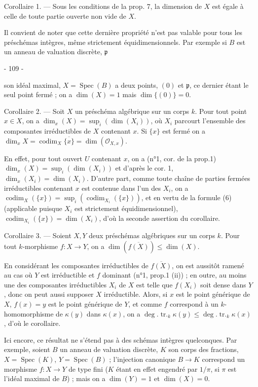 Corollaire 1. — Sous les conditions de la prop. 7, la dimension de $X$ est égale à celle de toute partie ouverte non vide de $X$.

Il convient de noter que cette dernière propriété n'est pas valable pour tous les préschémas intègres, même strictement équidimensionnels. Par exemple si $B$ est un anneau de valuation discrète, $\mathfrak{p}$

\newpage


- 109 -

son idéal maximal, $X=\operatorname{Spec}(B)$ a deux points, $(0)$ et $\mathfrak{p}$, ce dernier étant le seul point fermé ; on a $\dim(X)=1$ mais $\dim\{(0)\}=0$.

Corollaire 2. — Soit $X$ un préschéma algébrique sur un corps $k$. Pour tout point $x \in X$, on a $\dim_x(X)=\sup_i(\dim(X_i))$, où $X_i$ parcourt l'ensemble des composantes irréductibles de $X$ contenant $x$. Si $\{x\}$ est fermé on a $\dim_x X = \operatorname{codim}_X \overline{\{x\}} = \dim(\mathcal{O}_{X,x})$.

En effet, pour tout ouvert $U$ contenant $x$, on a (n°1, cor. de la prop.1) $\dim_x(X)=\sup_i(\dim(X_i))$ et d'après le cor. 1, $\dim_x(X_i) = \dim(X_i)$. D'autre part, comme toute chaîne de parties fermées irréductibles contenant $x$ est contenue dans l'un des $X_i$, on a $\operatorname{codim}_X(\{x\}) = \sup_i(\operatorname{codim}_{X_i}(\{x\}))$, et en vertu de la formule (6) (applicable puisque $X_i$ est strictement équidimensionnel), $\operatorname{codim}_{X_i}(\{x\}) = \dim(X_i)$, d'où la seconde assertion du corollaire.

Corollaire 3. — Soient $X, Y$ deux préschémas algébriques sur un corps $k$. Pour tout $k$-morphisme $f : X \to Y$, on a $\dim(\overline{f(X)}) \leq \dim(X)$.

En considérant les composantes irréductibles de $\overline{f(X)}$, on est aussitôt ramené au cas où $Y$ est irréductible et $f$ dominant (n°1, prop.1 (ii)) ; en outre, au moins une des composantes irréductibles $X_i$ de $X$ est telle que $f(X_i)$ soit dense dans $Y$, donc on peut aussi supposer $X$ irréductible. Alors, si $x$ est le point générique de $X$, $f(x)=y$ est le point générique de $Y$, et comme $f$ correspond à un $k$-homomorphisme de $\kappa(y)$ dans $\kappa(x)$, on a $\deg.\operatorname{tr.}_k \kappa(y) \leq \deg.\operatorname{tr.}_k \kappa(x)$, d'où le corollaire.

Ici encore, ce résultat ne s'étend pas à des schémas intègres quelconques. Par exemple, soient $B$ un anneau de valuation discrète, $K$ son corps des fractions, $X=\operatorname{Spec}(K)$, $Y=\operatorname{Spec}(B)$ ; l'injection canonique $B \to K$ correspond un morphisme $f : X \to Y$ de type fini ($K$ étant en effet engendré par $1/\pi$, si $\pi$ est l'idéal maximal de $B$) ; mais on a $\dim(Y)=1$ et $\dim(X)=0$.

